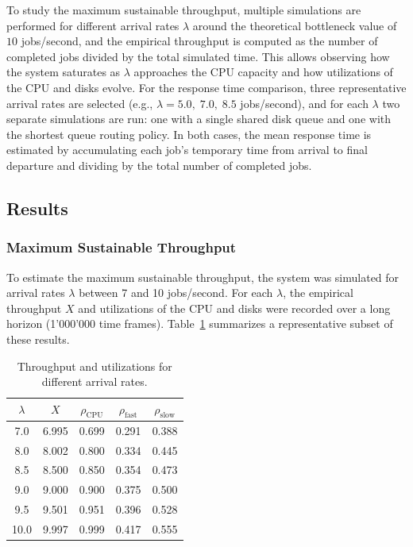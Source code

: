 \documentclass[a4paper,10pt]{article}
\begin{document}
To study the maximum sustainable throughput, multiple simulations are performed for different arrival rates $\lambda$ around the theoretical bottleneck value of $10$ jobs/second, and the empirical throughput is computed as the number of completed jobs divided by the total simulated time. This allows observing how the system saturates as $\lambda$ approaches the CPU capacity and how utilizations of the CPU and disks evolve. For the response time comparison, three representative arrival rates are selected (e.g., $\lambda = 5.0,\; 7.0,\; 8.5$ jobs/second), and for each $\lambda$ two separate simulations are run: one with a single shared disk queue and one with the shortest queue routing policy. In both cases, the mean response time is estimated by accumulating each job’s temporary time from arrival to final departure and dividing by the total number of completed jobs. 

\subsection{Results}

\subsubsection{Maximum Sustainable Throughput}

To estimate the maximum sustainable throughput, the system was simulated for arrival rates $\lambda$ between 7 and 10 jobs/second. For each $\lambda$, the empirical throughput $X$ and utilizations of the CPU and disks were recorded over a long horizon (1'000'000 time frames). Table~\ref{tab:throughput} summarizes a representative subset of these results. 

\begin{table}[ht]
  \centering
  \caption{Throughput and utilizations for different arrival rates.}
  \label{tab:throughput}
  \begin{tabular}{c c c c c}
    \hline
    $\lambda$ & $X$ & $\rho_{\text{CPU}}$ & $\rho_{\text{fast}}$ & $\rho_{\text{slow}}$ \\
    \hline
    7.0  & 6.995 & 0.699 & 0.291 & 0.388 \\
    8.0  & 8.002 & 0.800 & 0.334 & 0.445 \\
    8.5  & 8.500 & 0.850 & 0.354 & 0.473 \\
    9.0  & 9.000 & 0.900 & 0.375 & 0.500 \\
    9.5  & 9.501 & 0.951 & 0.396 & 0.528 \\
    10.0 & 9.997 & 0.999 & 0.417 & 0.555 \\
    \hline
  \end{tabular}
\end{table}
\end{document}
